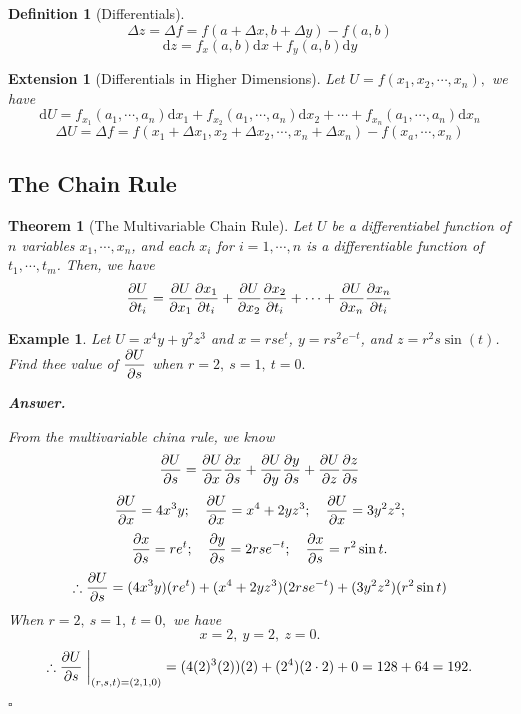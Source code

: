 \documentclass[12pt,a4paper]{article}
\newtheorem{thm}{Theorem}[subsection]
\newtheorem{df}{Definition}[subsection]
\newtheorem{eg}{Example}[subsection]
\newenvironment*{ans}{\par\indent\textbf{\textit{Answer. }}\par}{\par\hfill{$\square$}\par}
\newtheorem*{ext}{\indent Extension}
\def\d{{\mathrm{d}}}
\def\dx{\d x}
\begin{document}
\begin{df}[Differentials]
	\[\Delta z=\Delta f=f(a+\Delta x, b+\Delta y)-f(a,b)\]\[\d z=f_x(a,b)\dx+f_y(a,b)\d y\]	
\end{df}
\begin{ext}[Differentials in Higher Dimensions]
	Let $U=f(x_1, x_2,\cdots, x_n),$ we have \[\d U=f_{x_1}(a_1,\cdots,a_n)\dx_1+f_{x_2}(a_1,\cdots,a_n)\dx_2+\cdots+f_{x_n}(a_1,\cdots,a_n)\dx_n\]\[\Delta U=\Delta f=f(x_1+\Delta x_1, x_2+\Delta x_2,\cdots, x_n+\Delta x_n)-f(x_a,\cdots,x_n)\]
\end{ext}

\subsection{The Chain Rule}
\begin{thm}[The Multivariable Chain Rule]
	Let $U$ be a differentiabel function of $n$ variables $x_1,\cdots,x_n$, and each $x_i$ for $i=1,\cdots,n$	is a differentiable function of $t_1,\cdots,t_m$. Then, we have \[\pdv{U}{t_i}=\pdv{U}{x_1}\pdv{x_1}{t_i}+\pdv{U}{x_2}\pdv{x_2}{t_i}+\cdots+\pdv{U}{x_n}\pdv{x_n}{t_i}\]
\end{thm}
\begin{eg}
	Let $U=x^4y+y^2z^3$ and $x=rse^t$, $y=rs^2e^{-t}$, and $z=r^2s\sin(t)$. Find thee value of $\displaystyle\pdv{U}{s}$ when $r=2,\ s=1,\ t=0.$
	\begin{ans}
		From the multivariable china rule, we know \[\pdv{U}{s}=\pdv{U}{x}\pdv{x}{s}+\pdv{U}{y}\pdv{y}{s}+\pdv{U}{z}\pdv{z}{s}\]	\[\pdv{U}{x}=4x^3y;\quad\pdv{U}{x}=x^4+2yz^3;\quad\pdv{U}{x}=3y^2z^2;\]\[\pdv{x}{s}=re^t;\quad\pdv{y}{s}=2rse^{-t};\quad\pdv{x}{s}=r^2\sin{t}.\] \[\therefore\pdv{U}{s}=(4x^3y)(re^t)+(x^4+2yz^3)(2rse^{-t})+(3y^2z^2)(r^2\sin{t})\] When $r=2,\ s=1,\ t=0,$ we have \[x=2,\ y=2,\ z=0.\] \[\therefore\pdv{U}{s}\eval{}_{(r,s,t)=(2,1,0)}=(4(2)^3(2))(2)+(2^4)(2\cdot2)+0=128+64=192.\]
	\end{ans}
\end{eg}
\end{document}
